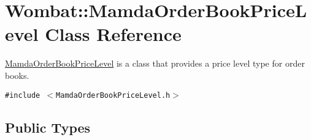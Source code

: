 \hypertarget{classWombat_1_1MamdaOrderBookPriceLevel}{
\section{Wombat::Mamda\-Order\-Book\-Price\-Level Class Reference}
\label{classWombat_1_1MamdaOrderBookPriceLevel}
}
\hyperlink{classWombat_1_1MamdaOrderBookPriceLevel}{Mamda\-Order\-Book\-Price\-Level} is a class that provides a price level type for order books.  


{\tt \#include $<$Mamda\-Order\-Book\-Price\-Level.h$>$}

\subsection*{Public Types}

